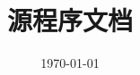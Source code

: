 \documentclass[
class = book,
zihao = -4,
font = times*,
paper = a4paper,
openany
]{easybook}
\begin{document}
	\title{\songti \NameCN \\ \Version \\ 源程序文档}
	\date{\today}

	\frontmatter[roman]
	\maketitle

	\mainmatter*
	\newpage

	
\end{document}
